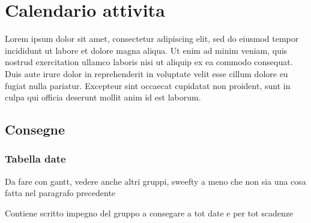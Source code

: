 \newpage
\section{Calendario attivita} \label{CalendarioAttivita}

	Lorem ipsum dolor sit amet, consectetur adipiscing elit, sed do eiusmod tempor incididunt ut labore et dolore magna aliqua. Ut enim ad minim veniam, quis nostrud exercitation ullamco laboris nisi ut aliquip ex ea commodo consequat. Duis aute irure dolor in reprehenderit in voluptate velit esse cillum dolore eu fugiat nulla pariatur. Excepteur sint occaecat cupidatat non proident, sunt in culpa qui officia deserunt mollit anim id est laborum.
	
	\subsection{Consegne}
		\subsubsection{Tabella date}

	Da fare con gantt, vedere anche altri gruppi, sweefty a meno che non sia una cosa fatta nel paragrafo precedente

	Contiene scritto impegno del gruppo a consegare a tot date e per tot scadenze